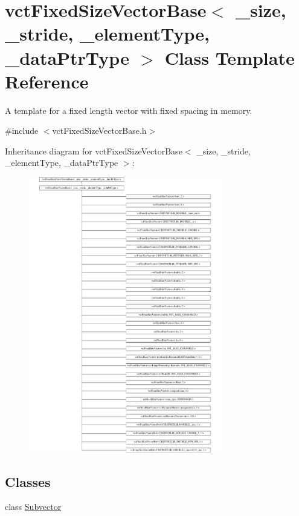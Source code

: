 \hypertarget{classvct_fixed_size_vector_base}{\section{vct\-Fixed\-Size\-Vector\-Base$<$ \-\_\-size, \-\_\-stride, \-\_\-element\-Type, \-\_\-data\-Ptr\-Type $>$ Class Template Reference}
\label{classvct_fixed_size_vector_base}
}


A template for a fixed length vector with fixed spacing in memory.  




{\ttfamily \#include $<$vct\-Fixed\-Size\-Vector\-Base.\-h$>$}

Inheritance diagram for vct\-Fixed\-Size\-Vector\-Base$<$ \-\_\-size, \-\_\-stride, \-\_\-element\-Type, \-\_\-data\-Ptr\-Type $>$\-:\begin{figure}[H]
\begin{center}
\leavevmode
\includegraphics[height=12.000000cm]{dc/d4e/classvct_fixed_size_vector_base}
\end{center}
\end{figure}
\subsection*{Classes}
\begin{DoxyCompactItemize}
\item 
class \hyperlink{classvct_fixed_size_vector_base_1_1_subvector}{Subvector}
\end{DoxyCompactItemize}
